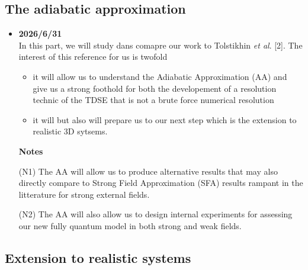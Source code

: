 \documentclass[11pt]{article}
\begin{document}
\subsection{The adiabatic approximation}
\begin{itemize}
\item \textbf{2026/6/31} \\
\indent In this part, we will study dans comapre our work to 
	Tolstikhin \textit{et al}. [2]. 
	The interest of this reference for us is twofold 
		\begin{itemize}
	\item it will allow us to understand 
		the Adiabatic Approximation (AA) and give us 
		a strong foothold for both the developement of 
		a resolution technic of the TDSE that is not a brute force
		numerical resolution
	\item it will but also will prepare us to our next step
		which is the extension to 
		realistic 3D sytsems.
		\end{itemize}

\textbf{Notes} 

        (N1) The AA will allow us to produce alternative results 
		that may also directly compare to 
		Strong Field Approximation (SFA) 
		results rampant in the litterature for strong external fields.

        (N2) The AA will also allow us to design internal experiments
		for assessing our new fully quantum model in both 
		strong and weak fields.

\end{itemize}
         
        

\subsection{Extension to realistic systems}
\end{document}
